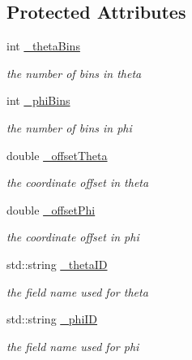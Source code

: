 \subsection*{Protected Attributes}
\begin{DoxyCompactItemize}
\item 
int \hyperlink{class_d_d4hep_1_1_d_d_segmentation_1_1_projective_cylinder_a3a9abd6b200a4093f80607c63cb60a27}{\_\-thetaBins}
\begin{DoxyCompactList}\small\item\em the number of bins in theta \item\end{DoxyCompactList}\item 
int \hyperlink{class_d_d4hep_1_1_d_d_segmentation_1_1_projective_cylinder_a80805ac35e9e3580d0d4e8dd0285ca4e}{\_\-phiBins}
\begin{DoxyCompactList}\small\item\em the number of bins in phi \item\end{DoxyCompactList}\item 
double \hyperlink{class_d_d4hep_1_1_d_d_segmentation_1_1_projective_cylinder_afb07d1274b199b7d48c6c915e149e5a6}{\_\-offsetTheta}
\begin{DoxyCompactList}\small\item\em the coordinate offset in theta \item\end{DoxyCompactList}\item 
double \hyperlink{class_d_d4hep_1_1_d_d_segmentation_1_1_projective_cylinder_aef1c8efbfba086c1df77dee8d24eb877}{\_\-offsetPhi}
\begin{DoxyCompactList}\small\item\em the coordinate offset in phi \item\end{DoxyCompactList}\item 
std::string \hyperlink{class_d_d4hep_1_1_d_d_segmentation_1_1_projective_cylinder_aa236579151e799c5aee4526a2fbbbdb2}{\_\-thetaID}
\begin{DoxyCompactList}\small\item\em the field name used for theta \item\end{DoxyCompactList}\item 
std::string \hyperlink{class_d_d4hep_1_1_d_d_segmentation_1_1_projective_cylinder_a371344e0fee63cfe8e6c58cf9132fde2}{\_\-phiID}
\begin{DoxyCompactList}\small\item\em the field name used for phi \item\end{DoxyCompactList}\end{DoxyCompactItemize}


